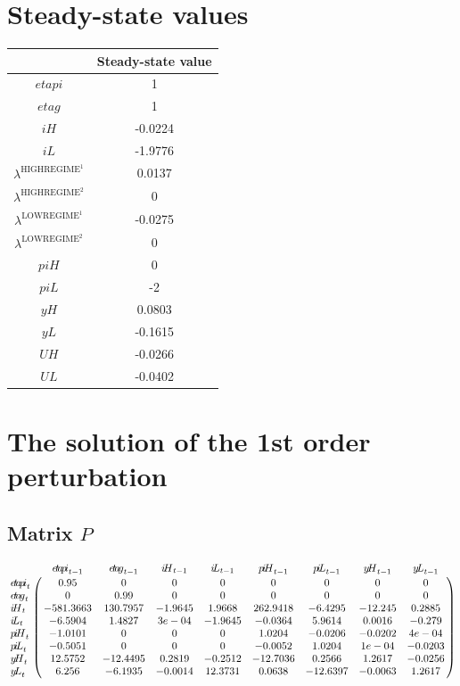 

\section{Steady-state values}


\begin{tabular}{c|c|}
  & Steady-state value\\
\hline
${e\!t\!a\!p\!i}$ & 1 \\
${e\!t\!a\!g}$ & 1 \\
${i\!H}$ & -0.0224 \\
${i\!L}$ & -1.9776 \\
$\lambda^{\mathrm{HIGHREGIME}^{\mathrm{1}}}$ & 0.0137 \\
$\lambda^{\mathrm{HIGHREGIME}^{\mathrm{2}}}$ & 0 \\
$\lambda^{\mathrm{LOWREGIME}^{\mathrm{1}}}$ & -0.0275 \\
$\lambda^{\mathrm{LOWREGIME}^{\mathrm{2}}}$ & 0 \\
${p\!i\!H}$ & 0 \\
${p\!i\!L}$ & -2 \\
${y\!H}$ & 0.0803 \\
${y\!L}$ & -0.1615 \\
${U\!H}$ & -0.0266 \\
${U\!L}$ & -0.0402 \\
\hline
\end{tabular}


\section{The solution of the 1st order perturbation}

\subsection*{Matrix $P$}

$$\bordermatrix{
~ & {e\!t\!a\!p\!i}_{t-1} & {e\!t\!a\!g}_{t-1} & {i\!H}_{t-1} & {i\!L}_{t-1} & {p\!i\!H}_{t-1} & {p\!i\!L}_{t-1} & {y\!H}_{t-1} & {y\!L}_{t-1} \cr
{e\!t\!a\!p\!i}_{t} & 0.95 & 0 & 0 & 0 & 0 & 0 & 0 & 0 \cr
{e\!t\!a\!g}_{t} & 0 & 0.99 & 0 & 0 & 0 & 0 & 0 & 0 \cr
{i\!H}_{t} & -581.3663 & 130.7957 & -1.9645 & 1.9668 & 262.9418 & -6.4295 & -12.245 & 0.2885 \cr
{i\!L}_{t} & -6.5904 & 1.4827 & 3e-04 & -1.9645 & -0.0364 & 5.9614 & 0.0016 & -0.279 \cr
{p\!i\!H}_{t} & -1.0101 & 0 & 0 & 0 & 1.0204 & -0.0206 & -0.0202 & 4e-04 \cr
{p\!i\!L}_{t} & -0.5051 & 0 & 0 & 0 & -0.0052 & 1.0204 & 1e-04 & -0.0203 \cr
{y\!H}_{t} & 12.5752 & -12.4495 & 0.2819 & -0.2512 & -12.7036 & 0.2566 & 1.2617 & -0.0256 \cr
{y\!L}_{t} & 6.256 & -6.1935 & -0.0014 & 12.3731 & 0.0638 & -12.6397 & -0.0063 & 1.2617 \cr
}$$

